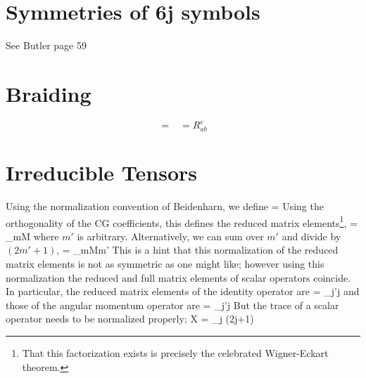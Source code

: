 \documentclass[12pt]{article}
\begin{document}
\section{Symmetries of 6j symbols}


See Butler page 59

\section{Braiding}

\iffalse

\begin{equation}
\begin{gathered}

\end{gathered}
=
\begin{gathered}

\end{gathered}
= R^c_{ab}
\begin{gathered}

\end{gathered}
\end{equation}


\section{Irreducible Tensors}

Using the normalization convention of Beidenharn, we define
\beq
{}
=  \; 
\label{eq:ITensorDef}
\eeq
Using the orthogonality of the CG coefficients, this defines the
reduced matrix elements\footnote{That this factorization exists is
  precisely the celebrated Wigner-Eckart theorem.},
\beq
{}
= \sum_{mM}  
\eeq
where $m'$ is arbitrary.  Alternatively,
we can sum over $m'$ and divide by $(2m'+1)$,
\beq
{}
= \sum_{mMm'}   
\eeq
This is a hint that this normalization of the reduced matrix elements
is not as symmetric as one might like; however
using this normalization the reduced and
full matrix elements of scalar operators coincide.  In particular,
the reduced matrix elements of the identity operator are
\beq
{} = \delta_{j'j}
\eeq
and those of the angular momentum operator are
\beq
{} =  \; \delta_{j'j}
\eeq
But the trace of a scalar operator needs to be normalized properly;
\beq
\Tr X = \sum_{j} (2j+1) 
\eeq
\end{document}
